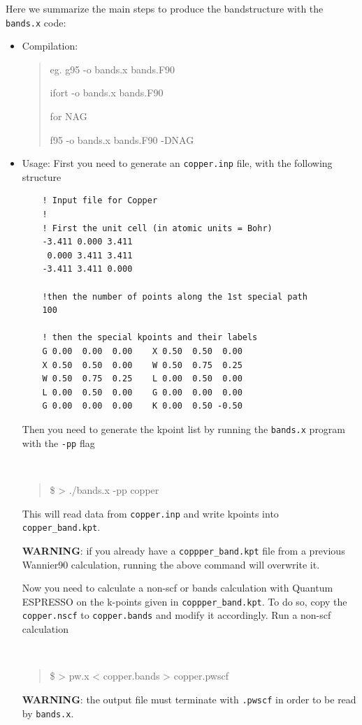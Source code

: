 \begin{tcolorbox}[colback=blue!5!white,title=BANDS.X MINITUTORIAL,float]
    {\small 
    Here we summarize the main steps to produce the bandstructure with the {\tt bands.x} code:

	\begin{itemize}
	\item Compilation: {\tt \begin{quote}
     eg. g95 -o bands.x bands.F90

         ifort -o bands.x bands.F90

    
    for NAG
     
         f95 -o bands.x bands.F90 -DNAG
         \end{quote}

    }

    \item Usage: First you need to generate an {\tt copper.inp} file, with the following structure
  
    \begin{verbatim}
    ! Input file for Copper
    !
    ! First the unit cell (in atomic units = Bohr)
    -3.411 0.000 3.411
     0.000 3.411 3.411
    -3.411 3.411 0.000
    
    !then the number of points along the 1st special path
    100

    ! then the special kpoints and their labels
    G 0.00  0.00  0.00    X 0.50  0.50  0.00
    X 0.50  0.50  0.00    W 0.50  0.75  0.25
    W 0.50  0.75  0.25    L 0.00  0.50  0.00
    L 0.00  0.50  0.00    G 0.00  0.00  0.00
    G 0.00  0.00  0.00    K 0.00  0.50 -0.50
    \end{verbatim}

    Then you need to generate the kpoint list by running the {\tt bands.x} program with the {\tt -pp} flag
    {\tt
    \begin{quote}
     \$ > ./bands.x -pp copper
    \end{quote}
    }
    This will read data from {\tt copper.inp} and write kpoints into {\tt copper\_band.kpt}. 

    {\bf WARNING}: if you already have a {\tt coppper\_band.kpt} file from a previous Wannier90 calculation, running the above command will overwrite it.

    Now you need to calculate a non-scf or bands calculation with Quantum ESPRESSO on the k-points given in {\tt coppper\_band.kpt}. To do so, copy the {\tt copper.nscf} to {\tt copper.bands} and modify it accordingly. Run a non-scf calculation
    {\tt
    \begin{quote}
    \$ > pw.x < copper.bands > copper.pwscf
    \end{quote} 
    }
    {\bf WARNING}: the output file must terminate with {\tt .pwscf} in order to be read by {\tt bands.x}.


\end{itemize}}
\end{tcolorbox}
